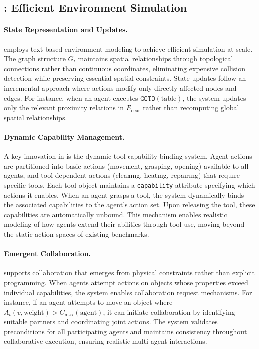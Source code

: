 \subsection{\simulator: Efficient Environment Simulation}

\paragraph{State Representation and Updates.}
\simulator employs text-based environment modeling to achieve efficient simulation at scale. The graph structure $G_t$ maintains spatial relationships through topological connections rather than continuous coordinates, eliminating expensive collision detection while preserving essential spatial constraints. State updates follow an incremental approach where actions modify only directly affected nodes and edges. For instance, when an agent executes $\texttt{GOTO}(\text{table})$, the system updates only the relevant proximity relations in $E_{\text{near}}$ rather than recomputing global spatial relationships.

\paragraph{Dynamic Capability Management.}
A key innovation in \simulator is the dynamic tool-capability binding system. Agent actions are partitioned into basic actions (movement, grasping, opening) available to all agents, and tool-dependent actions (cleaning, heating, repairing) that require specific tools. Each tool object maintains a \texttt{capability} attribute specifying which actions it enables. When an agent grasps a tool, the system dynamically binds the associated capabilities to the agent's action set. Upon releasing the tool, these capabilities are automatically unbound. This mechanism enables realistic modeling of how agents extend their abilities through tool use, moving beyond the static action spaces of existing benchmarks.

\paragraph{Emergent Collaboration.}
\simulator supports collaboration that emerges from physical constraints rather than explicit programming. When agents attempt actions on objects whose properties exceed individual capabilities, the system enables collaboration request mechanisms. For instance, if an agent attempts to move an object where $A_t(v, \text{weight}) > C_{\max}(\text{agent})$, it can initiate collaboration by identifying suitable partners and coordinating joint actions. The system validates preconditions for all participating agents and maintains consistency throughout collaborative execution, ensuring realistic multi-agent interactions.

